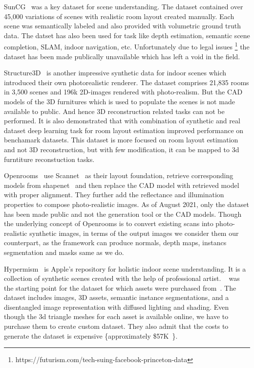 SunCG~\cite{Song2017SemanticSC} was a key dataset for scene understanding.
The dataset contained over 45,000 variations of scenes with realistic room layout created manually.
Each scene was semantically labeled and also provided with volumetric ground truth data.
The datset has also been used for task like depth estimation, semantic scene completion, SLAM, indoor navigation, etc.
Unfortunately due to legal issues \footnote{https://futurism.com/tech-suing-facebook-princeton-data} the dataset has been made publically unavailable which has left a void in the field.

Structure3D~\cite{zheng2020structured3d} is another impressive synthetic data for indoor scenes which introduced their own photorealistic renderer.
The dataset comprises 21,835 rooms in 3,500 scenes and 196k 2D-images rendered with photo-realism.
But the CAD models of the 3D furnitures which is used to populate the scenes is not made available to public.
And hence 3D reconstruction related tasks can not be performed.
It is also demonstrated that with combination of synthetic and real dataset deep learning task for room layout estimation improved performance on benchamark datasets.
This dataset is more focused on room layout estimation and not 3D reconstruction, but with few modification, it can be mapped to 3d furntiture reconstuction tasks.

Openrooms~\cite{li2021openrooms} use Scannet~\cite{dai2017scannet} as their layout foundation, retrieve corresponding models from shapenet~\cite{chang2015shapenet}
and then replace the CAD model with retrieved model with proper alignment.
They further add the reflectance and illumination properties to compose photo-realistic images.
As of August 2021, only the dataset has been made public and not the generation tool or the CAD models.
Though the underlying concept of Openrooms is to convert existing scans into photo-realistic synthetic images, in terms of the output images we consider them our counterpart, as the framework can produce normals, depth maps, instancs segmentation and masks same as we do.

Hypermism~\cite{Roberts2020HypersimAP} is Apple's repository for holistic indoor scene understanding.
It is a collection of synthetic scenes created with the help of professional artist.
~\cite{Evermotion} was the starting point for the dataset for which assets were purchased from~\cite{TurboSquid}.
The dataset includes images, 3D assets, semantic instance segmentations, and a disentangled image representation with diffused lighting and shading.
Even though the 3d triangle meshes for each asset is available online, we have to purchase them to create custom dataset.
They also admit that the costs to generate the dataset is expensive \{approximately \$57K~\cite{Roberts2020HypersimAP}\}.

